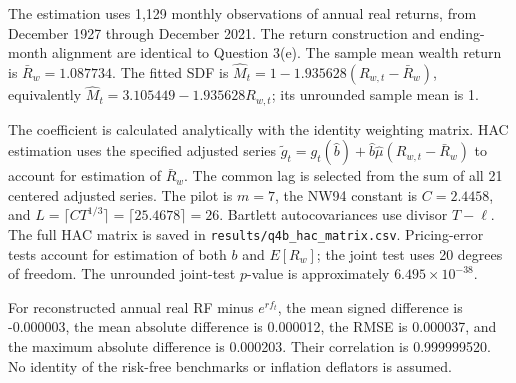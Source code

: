The estimation uses 1,129 monthly observations of annual real returns, from December 1927 through December 2021.
The return construction and ending-month alignment are identical to Question 3(e).
The sample mean wealth return is $\bar R_w=1.087734$.
The fitted SDF is $\hat M_t=1-1.935628(R_{w,t}-\bar R_w)$,
equivalently $\hat M_t=3.105449-1.935628R_{w,t}$; its unrounded sample mean is 1.

The coefficient is calculated analytically with the identity weighting matrix.
HAC estimation uses the specified adjusted series
$\tilde g_t=g_t(\hat b)+\hat b\hat\mu(R_{w,t}-\bar R_w)$ to account for estimation of $\bar R_w$.
The common lag is selected from the sum of all 21 centered adjusted series.
The pilot is $m=7$, the NW94 constant is $C=2.4458$,
and $L=\lceil CT^{1/3}\rceil=\lceil 25.4678\rceil=26$.
Bartlett autocovariances use divisor $T-\ell$.
The full HAC matrix is saved in \texttt{results/q4b\_hac\_matrix.csv}.
Pricing-error tests account for estimation of both $b$ and $E[R_w]$; the joint test uses 20 degrees of freedom.
The unrounded joint-test $p$-value is approximately $6.495\times10^{-38}$.

For reconstructed annual real RF minus $e^{rf_t}$, the mean signed difference is
-0.000003, the mean absolute difference is 0.000012, the RMSE is 0.000037,
and the maximum absolute difference is 0.000203.
Their correlation is 0.999999520.
No identity of the risk-free benchmarks or inflation deflators is assumed.
